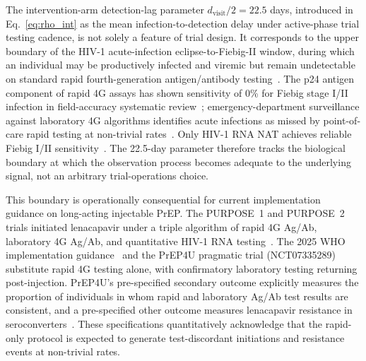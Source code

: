 \documentclass[11pt]{article}
\begin{document}
The intervention-arm detection-lag parameter $d_{\mathrm{visit}}/2 = 22.5$ days, introduced in Eq.~\ref{eq:rho_int} as the mean infection-to-detection delay under active-phase trial testing cadence, is not solely a feature of trial design. It corresponds to the upper boundary of the HIV-1 acute-infection eclipse-to-Fiebig-II window, during which an individual may be productively infected and viremic but remain undetectable on standard rapid fourth-generation antigen/antibody testing~\cite{fiebig2003}. The p24 antigen component of rapid 4G assays has shown sensitivity of 0\% for Fiebig stage I/II infection in field-accuracy systematic review~\cite{rdt4g_systematic}; emergency-department surveillance against laboratory 4G algorithms identifies acute infections as missed by point-of-care rapid testing at non-trivial rates~\cite{ed_poc_2024,stekler2016determine}. Only HIV-1 RNA NAT achieves reliable Fiebig I/II sensitivity~\cite{branson2014}. The 22.5-day parameter therefore tracks the biological boundary at which the observation process becomes adequate to the underlying signal, not an arbitrary trial-operations choice.

This boundary is operationally consequential for current implementation guidance on long-acting injectable PrEP. The PURPOSE~1 and PURPOSE~2 trials initiated lenacapavir under a triple algorithm of rapid 4G Ag/Ab, laboratory 4G Ag/Ab, and quantitative HIV-1 RNA testing~\cite{bekker2024,kelley2025}. The 2025 WHO implementation guidance~\cite{who_len_2025} and the PrEP4U pragmatic trial (NCT07335289)~\cite{prep4u_nct} substitute rapid 4G testing alone, with confirmatory laboratory testing returning post-injection. PrEP4U's pre-specified secondary outcome explicitly measures the proportion of individuals in whom rapid and laboratory Ag/Ab test results are consistent, and a pre-specified other outcome measures lenacapavir resistance in seroconverters~\cite{prep4u_nct}. These specifications quantitatively acknowledge that the rapid-only protocol is expected to generate test-discordant initiations and resistance events at non-trivial rates.
\end{document}
